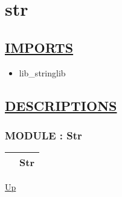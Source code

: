 \chapter*{str}
\hypertarget{ecldoc:toc:str}{}

\section*{\underline{IMPORTS}}
\begin{itemize}
\item lib\_stringlib
\end{itemize}

\section*{\underline{DESCRIPTIONS}}
\subsection*{MODULE : Str}
\hypertarget{ecldoc:Str}{}

{\renewcommand{\arraystretch}{1.5}
\begin{tabularx}{\textwidth}{|>{\raggedright\arraybackslash}l|X|}
\hline
\hspace{0pt} & Str \\
\hline
\end{tabularx}
}

\hyperlink{ecldoc:toc:root}{Up}

\par


